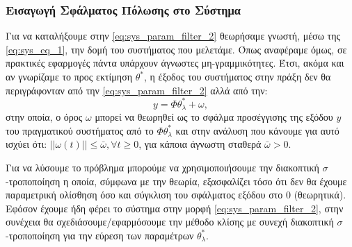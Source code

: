 \documentclass[12pt]{article} %
\numberwithin{equation}{section}  %
\begin{document}
\subsubsection{Εισαγωγή Σφάλματος Πόλωσης στο Σύστημα}
Για να καταλήξουμε στην \eqref{eq:sys_param_filter_2} θεωρήσαμε γνωστή, μέσω της \eqref{eq:sys_eq_1}, την δομή του συστήματος που μελετάμε.
Όπως αναφέραμε όμως, σε πρακτικές εφαρμογές πάντα υπάρχουν άγνωστες μη-γραμμικότητες. 
Έτσι, ακόμα και αν γνωρίζαμε το προς εκτίμηση \(\theta^*\), η έξοδος του συστήματος στην πράξη δεν θα περιγράφονταν από την \eqref{eq:sys_param_filter_2} αλλά από την:
\begin{equation}\label{eq:system_polosi}
    y = \Phi \theta_{\lambda}^{*} + \omega, 
\end{equation}
στην οποία, ο όρος \(\omega\) μπορεί να θεωρηθεί ως το σφάλμα προσέγγισης της εξόδου \(y\) του πραγματικού συστήματος από το $\Phi \theta_{\lambda}^{*}$ και στην ανάλυση που κάνουμε για αυτό ισχύει ότι: $||\omega(t)|| \le \bar{\omega}, \forall t \ge 0$, για κάποια άγνωστη σταθερά $\bar{\omega} > 0$.

Για να λύσουμε το πρόβλημα μπορούμε να χρησιμοποιήσουμε την διακοπτική $\sigma$-τροποποίηση η οποία, σύμφωνα με την θεωρία, 
εξασφαλίζει τόσο ότι δεν θα έχουμε παραμετρική ολίσθηση όσο και σύγκλιση του σφάλματος εξόδου στο $0$ (θεωρητικά).
Εφόσον έχουμε ήδη φέρει το σύστημα στην μορφή \eqref{eq:sys_param_filter_2}, στην συνέχεια θα σχεδιάσουμε/εφαρμόσουμε την μέθοδο κλίσης με συνεχή διακοπτική $\sigma$-τροποποίηση για την εύρεση των παραμέτρων $\theta_{\lambda}^{*}$.
\end{document}
